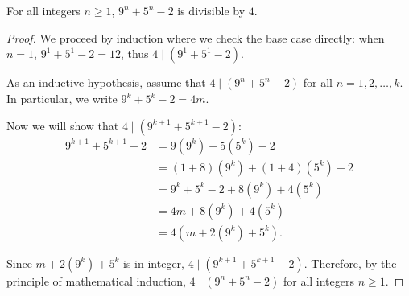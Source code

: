 \begin{proposition}
  For all integers \(n \geq 1\), \(9^n + 5^n - 2\) is divisible by $4$.
\end{proposition}
\begin{proof}
  We proceed by induction where we check the base case directly: when \(n = 1\), \(9^1 + 5^1 - 2 = 12\), thus \(4 \mid (9^1 + 5^1 - 2)\).

  As an inductive hypothesis, assume that \(4 \mid (9^n + 5^n - 2)\) for all \(n = 1, 2, \dots, k\). In particular, we write \(9^k + 5^k - 2 = 4m\).

  Now we will show that \(4 \mid (9^{k+1} + 5^{k+1} - 2)\): \begin{align*}
    9^{k+1} + 5^{k+1} - 2
    &= 9(9^k) + 5(5^k) - 2 \\
    &= (1+8)(9^k) + (1 + 4)(5^k) - 2 \\
    &= 9^k + 5^k - 2 + 8(9^k) + 4(5^k) \\
    &= 4m + 8(9^k) + 4(5^k) \\
    &= 4(m + 2(9^k) + 5^k).
  \end{align*}

  Since \(m + 2(9^k) + 5^k\) is in integer, \(4 \mid (9^{k+1} + 5^{k+1} - 2)\). Therefore, by the principle of mathematical induction, \(4 \mid (9^{n} + 5^{n} - 2)\) for all integers \(n \geq 1\).
\end{proof}

